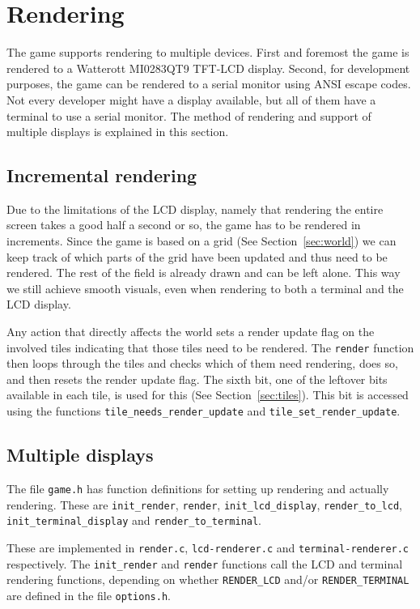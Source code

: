 \section{Rendering}
\label{sec:rendering}

The game supports rendering to multiple devices. First and foremost the game is
rendered to a Watterott MI0283QT9 TFT-LCD display. Second, for development
purposes, the game can be rendered to a serial monitor using ANSI escape codes.
Not every developer might have a display available, but all of them have a
terminal to use a serial monitor. The method of rendering and support of
multiple displays is explained in this section.

\subsection{Incremental rendering}
\label{sec:incremental-rendering}
Due to the limitations of the LCD display, namely that rendering the entire
screen takes a good half a second or so, the game has to be rendered in
increments. Since the game is based on a grid (See Section~\ref{sec:world}) we
can keep track of which parts of the grid have been updated and thus need to be
rendered. The rest of the field is already drawn and can be left alone. This
way we still achieve smooth visuals, even when rendering to both a terminal and
the LCD display.

Any action that directly affects the world sets a render update flag on the
involved tiles indicating that those tiles need to be rendered. The
\texttt{render} function then loops through the tiles and checks which of
them need rendering, does so, and then resets the render update flag. The sixth
bit, one of the leftover bits available in each tile, is used for this (See
Section~\ref{sec:tiles}). This bit is accessed using the functions
\texttt{tile\_needs\_render\_update} and \texttt{tile\_set\_render\_update}.

\subsection{Multiple displays}
\label{sec:rendering-code}
The file \texttt{game.h} has function definitions for setting up rendering and
actually rendering. These are \texttt{init\_render}, \texttt{render},
\texttt{init\_lcd\_display}, \texttt{render\_to\_lcd},
\texttt{init\_terminal\_display} and \texttt{render\_to\_terminal}.

These are implemented in \texttt{render.c}, \texttt{lcd-renderer.c} and
\texttt{terminal-renderer.c} respectively. The \texttt{init\_render} and
\texttt{render} functions call the LCD and terminal rendering functions,
depending on whether \texttt{RENDER\_LCD} and/or \texttt{RENDER\_TERMINAL} are
defined in the file \texttt{options.h}.

